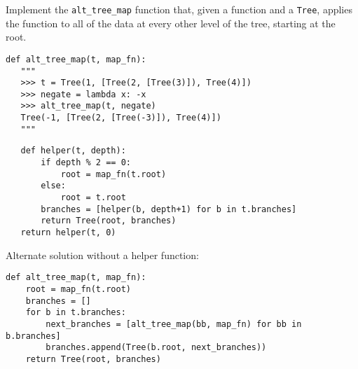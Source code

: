 \question Implement the \texttt{alt\_tree\_map} function that, given a function
and a \texttt{Tree}, applies the function to all of the data at every other
level of the tree, starting at the root.

\begin{lstlisting}
def alt_tree_map(t, map_fn):
   """
   >>> t = Tree(1, [Tree(2, [Tree(3)]), Tree(4)])
   >>> negate = lambda x: -x
   >>> alt_tree_map(t, negate)
   Tree(-1, [Tree(2, [Tree(-3)]), Tree(4)])
   """
\end{lstlisting}
\begin{solution}[1.5in]
\begin{lstlisting}
   def helper(t, depth):
       if depth % 2 == 0:
           root = map_fn(t.root)
       else:
           root = t.root
       branches = [helper(b, depth+1) for b in t.branches]
       return Tree(root, branches)
   return helper(t, 0)
\end{lstlisting}
Alternate solution without a helper function:
\begin{lstlisting}
def alt_tree_map(t, map_fn):
    root = map_fn(t.root)
    branches = []
    for b in t.branches:
        next_branches = [alt_tree_map(bb, map_fn) for bb in b.branches]
        branches.append(Tree(b.root, next_branches))
    return Tree(root, branches)
\end{lstlisting}
\end{solution}
